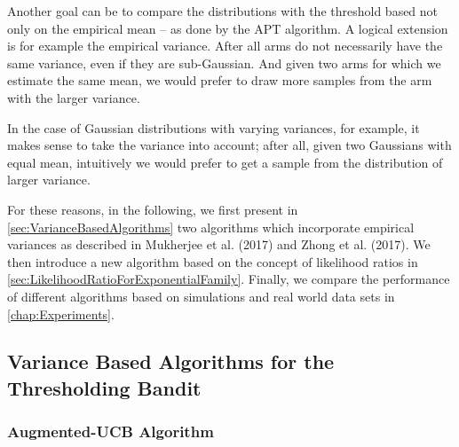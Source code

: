\documentclass[11pt,]{article}
\begin{document}
Another goal can be to compare the distributions with the threshold
based not only on the empirical mean -- as done by the APT algorithm. A
logical extension is for example the empirical variance. After all arms
do not necessarily have the same variance, even if they are
sub-Gaussian. And given two arms for which we estimate the same mean, we
would prefer to draw more samples from the arm with the larger variance.

In the case of Gaussian distributions with varying variances, for
example, it makes sense to take the variance into account; after all,
given two Gaussians with equal mean, intuitively we would prefer to get
a sample from the distribution of larger variance.

For these reasons, in the following, we first present in
\autoref{sec:VarianceBasedAlgorithms} two algorithms which incorporate
empirical variances as described in Mukherjee et al. (2017) and Zhong et
al. (2017). We then introduce a new algorithm based on the concept of
likelihood ratios in \autoref{sec:LikelihoodRatioForExponentialFamily}.
Finally, we compare the performance of different algorithms based on
simulations and real world data sets in \autoref{chap:Experiments}.

\subsection{\texorpdfstring{Variance Based Algorithms for the
Thresholding Bandit
\label{sec:VarianceBasedAlgorithms}}{Variance Based Algorithms for the Thresholding Bandit }}\label{variance-based-algorithms-for-the-thresholding-bandit}

\subsubsection{\texorpdfstring{Augmented-UCB Algorithm
\label{sec:AugUCBAlgorithm}}{Augmented-UCB Algorithm }}\label{augmented-ucb-algorithm}
\end{document}
